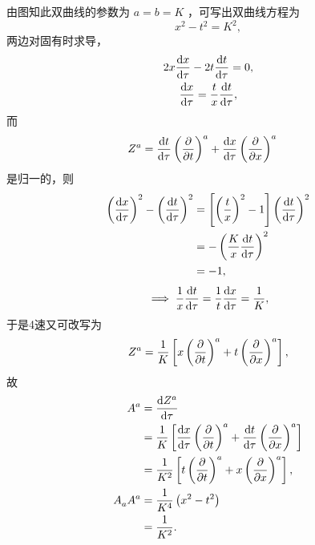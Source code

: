 \begin{xiti}
	\begin{jie}
		由图知此双曲线的参数为 $a=b=K$ ，可写出双曲线方程为
		\begin{equation*}
			x^2-t^2=K^2,
		\end{equation*}
		两边对固有时求导，
		\begin{gather*}
			2x \dv{x}{\tau} - 2t \dv{t}{\tau} = 0,\\
			\dv{x}{\tau} = \frac{t}{x} \dv{t}{\tau},
		\end{gather*}
		而
		\begin{equation*}
			\begin{split}
				\tensor{Z}{^a} &= \dv{t}{\tau} \tensor{\left(\pdv{t}\right)}{^a} + \dv{x}{\tau} \tensor{\left(\pdv{x}\right)}{^a}
			\end{split}
		\end{equation*}
		是归一的，则
		\begin{equation*}
			\begin{split}
				\left(\dv{x}{\tau} \right)^2 - \left( \dv{t}{\tau} \right)^2 &= \left[ \left(\frac{t}{x}\right)^2 - 1 \right] \left( \dv{t}{\tau} \right)^2\\
				&= - \left( \frac{K}{x} \dv{t}{\tau} \right)^2\\
				&= -1,
			\end{split}
		\end{equation*}
		\begin{equation*}
			\implies \frac{1}{x} \dv{t}{\tau} = \frac{1}{t} \dv{x}{\tau} = \frac{1}{K},
		\end{equation*}
		于是4速又可改写为
		\begin{equation*}
			\tensor{Z}{^a} = \frac{1}{K} \left[ x \tensor{\left(\pdv{t}\right)}{^a} + t \tensor{\left(\pdv{x}\right)}{^a} \right],
		\end{equation*}
		故
		\begin{equation*}
			\begin{split}
				\tensor{A}{^a} &= \dv{\tensor{Z}{^a}}{\tau}\\
				&= \frac{1}{K} \left[ \dv{x}{\tau} \tensor{\left(\pdv{t}\right)}{^a} + \dv{t}{\tau} \tensor{\left(\pdv{x}\right)}{^a} \right]\\
				&= \frac{1}{K^2} \left[ t \tensor{\left(\pdv{t}\right)}{^a} + x \tensor{\left(\pdv{x}\right)}{^a} \right],\\
				\tensor{A}{_a} \tensor{A}{^a} &= \frac{1}{K^4} \left( x^2 - t^2 \right)\\
				&= \frac{1}{K^2}.
			\end{split}
		\end{equation*}
	\end{jie}


\end{xiti}
